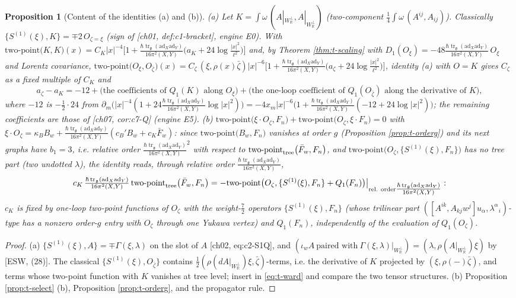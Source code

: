 \documentclass[11pt]{report}
\theoremstyle{plain}
\newtheorem{proposition}[theorem]{Proposition}
\theoremstyle{definition}
\numberwithin{equation}{chapter}
\newcommand{\unit}{\tfrac{\hbar\operatorname{tr}_{\mathfrak g}(\mathrm{ad}_X\mathrm{ad}_Y)}{16\pi^2(X,Y)}}
\newcommand{\Wp}{W_{\mathbb R}^\perp}
\newcommand{\TP}[2]{\mathrm{two\mbox{-}point}\big(#1,#2\big)}
\newcommand{\TPz}[2]{\mathrm{two\mbox{-}point}_{\rm tree}\big(#1,#2\big)}
\begin{document}
\begin{proposition}[Content of the identities (a) and (b)]
\label{prop:t-konishiward}
(a) Let $K=\int\omega\,(A|_{\Wp},A|_{\Wp})$ (two-component $\tfrac14\int\omega\,(A^{ij},A_{ij})$). Classically $\{S^{(1)}(\xi),K\}=\mp2\,O_{\zeta=\xi}$ (sign of [ch01, def:c1-bracket], engine E0). With $\TP{K}{K}(x)=C_K|x|^{-4}\big[1+\unit\big(a_K+24\log\tfrac{|x|^2}{\ell^2}\big)\big]$ and, by Theorem \ref{thm:t-scaling} with $D_1(O_\xi)=-48\unit\,O_\xi$ and Lorentz covariance, $\TP{O_\xi}{O_{\bar\zeta}}(x)=C_\zeta\,(\xi,\rho(x)\bar\zeta)|x|^{-6}\big[1+\unit\big(a_\zeta+24\log\tfrac{|x|^2}{\ell^2}\big)\big]$, identity (a) with $O=K$ gives $C_\zeta$ as a fixed multiple of $C_K$ and
\[
a_\zeta-a_K=-12+\big(\text{the coefficients of }Q_1(K)\text{ along }O_\xi\big)+\big(\text{the one-loop coefficient of }Q_1(O_{\bar\zeta})\text{ along the derivative of }K\big),
\]
where $-12$ is $-\tfrac12\cdot24$ from $\partial_m\big(|x|^{-4}(1+24\unit\log|x|^2)\big)=-4x_m|x|^{-6}\big(1+\unit(-12+24\log|x|^2)\big)$; the remaining coefficients are those of [ch07, cor:c7-Q] (engine E5). (b) $\TP{\xi\cdot O_\zeta}{F_n}+\TP{O_\zeta}{\xi\cdot F_n}=0$ with $\xi\cdot O_\zeta=\kappa_BB_w+\unit(c_B'B_w+c_K\bar F_w)$: since $\TP{B_w}{F_n}$ vanishes at order $g$ (Proposition \ref{prop:t-orderg}) and its next graphs have $b_1=3$, i.e. relative order $\unit^2$ with respect to $\TPz{\bar F_w}{F_n}$, and $\TP{O_\zeta}{\{S^{(1)}(\xi),F_n\}}$ has no tree part (two undotted $\lambda$), the identity reads, through relative order $\unit$,
\[
c_K\,\unit\,\TPz{\bar F_w}{F_n}=-\TP{O_\zeta}{\{S^{(1)}(\xi),F_n\}+Q_1(F_n)}\big|_{\text{rel. order}\unit}:
\]
$c_K$ is fixed by one-loop two-point functions of $O_\zeta$ with the weight-$\tfrac72$ operators $\{S^{(1)}(\xi),F_n\}$ (whose trilinear part $([A^{ik},A_{kj}w^j]u_\alpha,\lambda^{\alpha}{}_i)$-type has a nonzero order-$g$ entry with $O_\zeta$ through one Yukawa vertex) and $Q_1(F_n)$, independently of the evaluation of $Q_1(O_\zeta)$.
\end{proposition}

\begin{proof}
(a) $\{S^{(1)}(\xi),A\}=\mp\Gamma(\xi,\lambda)$ on the slot of $A$ [ch02, eq:c2-S1Q], and $(\iota_wA\ \text{paired with}\ \Gamma(\xi,\lambda)|_{\Wp})=(\lambda,\rho(A|_{\Wp})\xi)$ by [ESW, (28)]. The classical $\{S^{(1)}(\xi),O_{\bar\zeta}\}$ contains $\tfrac12(\rho(dA|_{\Wp})\xi,\bar\zeta)$-terms, i.e. the derivative of $K$ projected by $(\xi,\rho(-)\bar\zeta)$, and terms whose two-point function with $K$ vanishes at tree level; insert in \eqref{eq:t-ward} and compare the two tensor structures. (b) Proposition \ref{prop:t-select} (b), Proposition \ref{prop:t-orderg}, and the propagator rule.
\end{proof}
\end{document}
